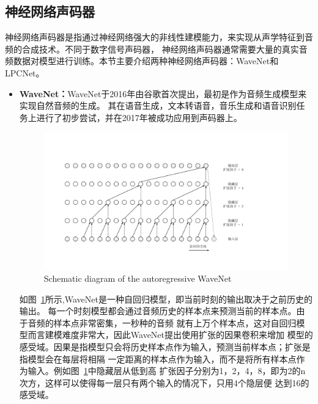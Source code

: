 \subsection{神经网络声码器}
神经网络声码器是指通过神经网络强大的非线性建模能力，来实现从声学特征到音频的合成技术。不同于数字信号声码器，
神经网络声码器通常需要大量的真实音频数据对模型进行训练。本节主要介绍两种神经网络声码器：WaveNet和LPCNet。

\begin{itemize}
    \item \textbf{WaveNet：}WaveNet于2016年由谷歌首次提出，最初是作为音频生成模型来实现自然音频的生成\cite{oord2016wavenet}。
    其在语音生成，文本转语音，音乐生成和语音识别任务上进行了初步尝试，并在2017年被成功应用到声码器上\cite{tamamori2017speaker}。
    
    \begin{figure}[!htp]
        \centering
        \includegraphics[width=13cm,trim=30 50 130 80,clip]{figure/2_wavenet.pdf}
        {Schematic diagram of the autoregressive WaveNet}
        \label{fig:wavenet}
    \end{figure}

    如图~\ref{fig:wavenet}所示,WaveNet是一种自回归模型，即当前时刻的输出取决于之前历史的输出。
    每一个时刻模型都会通过音频历史的样本点来预测当前的样本点。由于音频的样本点非常密集，一秒种的音频
    就有上万个样本点，这对自回归模型而言建模难度非常大，因此WaveNet提出使用扩张的因果卷积来增加
    模型的感受域。因果是指模型只会将历史样本点作为输入，预测当前样本点；扩张是指模型会在每层将相隔
    一定距离的样本点作为输入，而不是将所有样本点作为输入。例如图~\ref{fig:wavenet}中隐藏层从低到高
    扩张因子分别为1，2，4，8，即为2的n次方，这样可以使得每一层只有两个输入的情况下，只用4个隐层便
    达到16的感受域。


\end{itemize}

